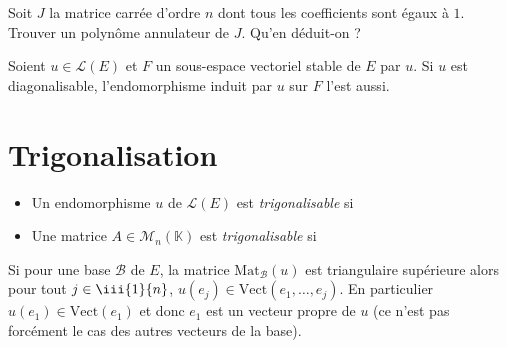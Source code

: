 \documentclass[french,11pt,twoside]{VcCours}
\begin{document}
 \begin{ApplicationDirecte}{} Soit $J$ la matrice carrée d'ordre $n$ dont tous les coefficients sont égaux à $1$. Trouver un polynôme annulateur de $J$. Qu'en déduit-on ?
 \end{ApplicationDirecte}
 
 \begin{Corollaire}{} Soient $u \in \mathcal{L}(E)$ et $F$ un sous-espace vectoriel stable de $E$ par $u$. Si $u$ est diagonalisable, l'endomorphisme induit par $u$ sur $F$ l'est aussi.
 \end{Corollaire}
 
 \begin{Demonstration}{} 
 
 \vspace{5cm}
 \end{Demonstration}
 
 \section{Trigonalisation}
 
 \begin{Definition}{} 
 
 \begin{itemize}
 \item Un endomorphisme $u$ de $\mathcal{L}(E)$ est \emph{trigonalisable} si 


 \item Une matrice $A \in \mathcal{M}_n(\mathbb{K})$ est \emph{trigonalisable} si
 
  
 \end{itemize}
 \end{Definition}
 
 \begin{Remarque}{} Si pour une base $\mathcal{B}$ de $E$, la matrice $\textrm{Mat}_{\mathcal{B}}(u)$ est triangulaire supérieure alors pour tout $j \in \iii{1}{n}$, $u(e_j) \in \textrm{Vect}(e_1, \ldots, e_j)$. En particulier $u(e_1) \in \textrm{Vect}(e_1)$ et donc $e_1$ est un vecteur propre de $u$ (ce n'est pas forcément le cas des autres vecteurs de la base).
 \end{Remarque}
 
\end{document}
